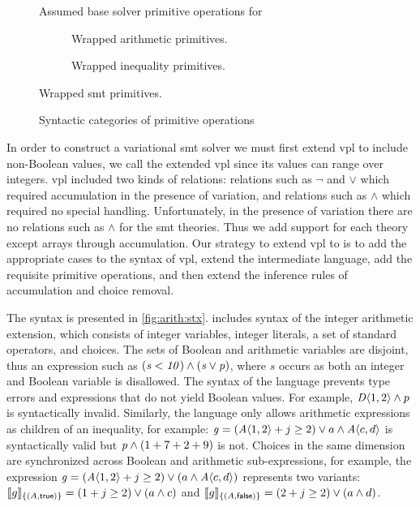 \label{section:vsmt:primitives}%
%
\begin{figure}
  
  \caption{Assumed base solver primitive operations for \evpl{}}%
  \label{fig:vsmt:primops}
\end{figure}
%
\begin{figure}
  \centering
  \begin{subfigure}[t]{\linewidth}
    
    \caption{Wrapped arithmetic primitives.}%
    \label{fig:vsmt:primops:arithmetic}
  \end{subfigure}
  \vfill
  \begin{subfigure}[t]{\linewidth}
    
    \caption{Wrapped inequality  primitives.}%
    \label{fig:vsmt:primops:inequality}
  \end{subfigure}
  \caption{Wrapped \ac{smt} primitives.}
\end{figure}
%
\begin{figure}
  
  \caption{Syntactic categories of primitive operations}%
  \label{fig:vsmt:categories}
\end{figure}
%
In order to construct a variational \ac{smt} solver we must first extend
\ac{vpl} to include non-Boolean values, we call the extended \ac{vpl} \evpl{}
since its values can range over integers. \ac{vpl} included two kinds of
relations: relations such as $\neg$ and $\vee$ which required accumulation in
the presence of variation, and relations such as $\wedge$ which required no
special handling. Unfortunately, in the presence of variation there are no
relations such as $\wedge$ for the \ac{smt} theories. Thus we add support for
each theory except arrays through accumulation. Our strategy to extend \ac{vpl}
to \evpl{} is to add the appropriate cases to the syntax of \ac{vpl}, extend the
intermediate language, add the requisite primitive operations, and then extend
the inference rules of accumulation and choice removal.

The \evpl{} syntax is presented in \autoref{fig:arith:stx}. \evpl{} includes
syntax of the integer arithmetic extension, which consists of integer variables,
integer literals, a set of standard operators, and choices.
%
The sets of Boolean and arithmetic variables are disjoint, thus an expression
such as $(\mathit{s < 10) \wedge (s \vee p})$, where $s$ occurs as both an integer
and Boolean variable is disallowed.
%
The syntax of the language prevents type errors and expressions that do not
yield Boolean values. For example, $\chc[D]{1,2} \wedge p$ is syntactically
invalid.
%
Similarly, the language only allows arithmetic expressions as children of an
inequality, for example: $\kf{g} = (\chc[A]{1, 2} + j \geq 2) \vee a \wedge
\chc[A]{c, d}$ is syntactically valid but $\mathit{p}{} \wedge{} (1 + 7 + 2 + 9)$ is
not.
%
Choices in the same dimension are synchronized across Boolean and arithmetic
sub-expressions, for example, the expression
%
$\kf{g} = (\chc[A]{1, 2} + j \geq 2) \vee (a \wedge \chc[A]{c,d})$
represents two variants:
%
$\sem[\{(A, \true)\}]{g} = (1 + j \geq 2) \vee (a \wedge c)$ and
$\sem[\{(A, \false)\}]{g} = (2 + j \geq 2) \vee (a \wedge d)$.

